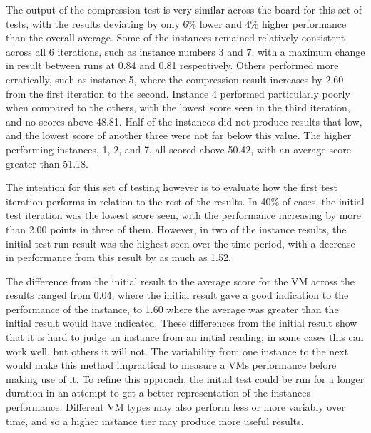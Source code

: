 \documentclass[conference]{IEEEtran}
\begin{document}
\begin{table*}[!h]
\begin{adjustbox}{width=\linewidth,center}
\end{adjustbox}
\end{table*}

The output of the compression test is very similar across the board for this set of tests, with the results deviating by only 6\% lower and 4\% higher performance than the overall average. Some of the instances remained relatively consistent across all 6 iterations, such as instance numbers 3 and 7, with a maximum change in result between runs at 0.84 and 0.81 respectively. Others performed more erratically, such as instance 5, where the compression result increases by 2.60 from the first iteration to the second. Instance 4 performed particularly poorly when compared to the others, with the lowest score seen in the third iteration, and no scores above 48.81. Half of the instances did not produce results that low, and the lowest score of another three were not far below this value. The higher performing instances, 1, 2, and 7, all scored above 50.42, with an average score greater than 51.18.

The intention for this set of testing however is to evaluate how the first test iteration performs in relation to the rest of the results. In 40\% of cases, the initial test iteration was the lowest score seen, with the performance increasing by more than 2.00 points in three of them. However, in two of the instance results, the initial test run result was the highest seen over the time period, with a decrease in performance from this result by as much as 1.52.

The difference from the initial result to the average score for the VM across the results ranged from 0.04, where the initial result gave a good indication to the performance of the instance, to 1.60 where the average was greater than the initial result would have indicated. These differences from the initial result show that it is hard to judge an instance from an initial reading; in some cases this can work well, but others it will not. The variability from one instance to the next would make this method impractical to measure a VMs performance before making use of it. To refine this approach, the initial test could be run for a longer duration in an attempt to get a better representation of the instances performance. Different VM types may also perform less or more variably over time, and so a higher instance tier may produce more useful results.
\end{document}
